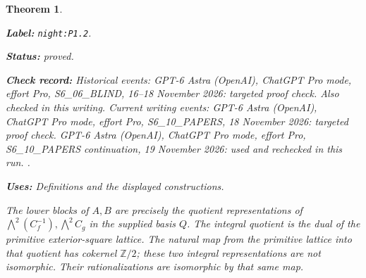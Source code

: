 \documentclass[11pt,a4paper]{article}
\newtheorem{theorem}{Theorem}[section]
\theoremstyle{definition}
\newcommand{\StatementRecord}[4]{\par\smallskip\begingroup\upshape\raggedright\noindent\textbf{Label:} \nolinkurl{#1}.\par\noindent\textbf{Status:} #2.\par\noindent\textbf{Check record:} #3.\par\noindent\textbf{Uses:} #4.\par\endgroup\smallskip}
\begin{document}
\begin{theorem}\label{night:P1.2}
\StatementRecord{night:P1.2}{proved}{Historical events: GPT-6 Astra (OpenAI), ChatGPT Pro mode, effort Pro, S6\_06\_BLIND, 16--18 November 2026: targeted proof check. Also checked in this writing. Current writing events: GPT-6 Astra (OpenAI), ChatGPT Pro mode, effort Pro, S6\_10\_PAPERS, 18 November 2026: targeted proof check. GPT-6 Astra (OpenAI), ChatGPT Pro mode, effort Pro, S6\_10\_PAPERS continuation, 19 November 2026: used and rechecked in this run. }{Definitions and the displayed constructions}
The lower blocks of $A,B$ are precisely the quotient representations of
$\bigwedge^2(C_f^{-1}),\bigwedge^2C_g$ in the supplied basis $Q$.
The integral quotient is the dual of the primitive exterior-square
lattice.  The natural map from the primitive lattice into that quotient
has cokernel $\mathbb Z/2$; these two integral representations are not
isomorphic.  Their rationalizations are isomorphic by that same map.
\end{theorem}
\end{document}
